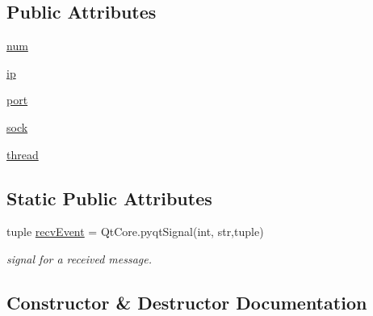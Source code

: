 \subsection*{Public Attributes}
\begin{DoxyCompactItemize}
\item 
\hyperlink{classnetwork_1_1NETWORK__CORE_1_1UDPChannel_a109eaf924bea52d095c5ecf68eb105ca}{num}
\item 
\hyperlink{classnetwork_1_1NETWORK__CORE_1_1UDPChannel_afc8c05885afa164854d35e9ce5a5cca9}{ip}
\item 
\hyperlink{classnetwork_1_1NETWORK__CORE_1_1UDPChannel_a020849db64086f44fb76565a2fac454e}{port}
\item 
\hyperlink{classnetwork_1_1NETWORK__CORE_1_1UDPChannel_aea64337d89b2d361b8631e0c54316567}{sock}
\item 
\hyperlink{classnetwork_1_1NETWORK__CORE_1_1UDPChannel_a8cead572d015248b58dafbcb0e7f4043}{thread}
\end{DoxyCompactItemize}
\subsection*{Static Public Attributes}
\begin{DoxyCompactItemize}
\item 
tuple \hyperlink{classnetwork_1_1NETWORK__CORE_1_1UDPChannel_aafe450b69fd43efc0912db494a042b42}{recv\+Event} = Qt\+Core.\+pyqt\+Signal(int, str,tuple)
\begin{DoxyCompactList}\small\item\em signal for a received message. \end{DoxyCompactList}\end{DoxyCompactItemize}


\subsection{Constructor \& Destructor Documentation}
\hypertarget{classnetwork_1_1NETWORK__CORE_1_1UDPChannel_a628f06fad9f7da98bbc9b5b6630271ea}{}
